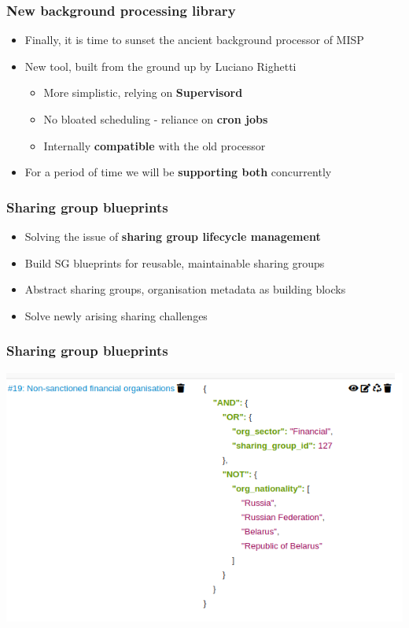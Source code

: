 \begin{frame}
\frametitle{New background processing library}
\begin{itemize}
	\item Finally, it is time to sunset the ancient background processor of MISP
        \item New tool, built from the ground up by Luciano Righetti
        \begin{itemize}
            \item More simplistic, relying on {\bf Supervisord}
            \item No bloated scheduling - reliance on {\bf cron jobs}
            \item Internally {\bf compatible} with the old processor
        \end{itemize}
        \item For a period of time we will be {\bf supporting both} concurrently
\end{itemize}
\end{frame}

\begin{frame}
  \frametitle{Sharing group blueprints}
  \begin{itemize}
     \item Solving the issue of {\bf sharing group lifecycle management}
     \item Build SG blueprints for reusable, maintainable sharing groups
     \item Abstract sharing groups, organisation metadata as building blocks
     \item Solve newly arising sharing challenges
  \end{itemize}
\end{frame}

\begin{frame}
\frametitle{Sharing group blueprints}
\includegraphics[scale=0.6]{images/blueprints2.png}
\end{frame}

